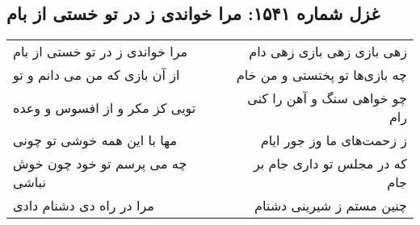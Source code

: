 \begin{center}
\section*{غزل شماره ۱۵۴۱: مرا خواندی ز در تو خستی از بام}
\label{sec:1541}
\begin{longtable}{l p{0.5cm} r}
مرا خواندی ز در تو خستی از بام
&&
زهی بازی زهی بازی زهی دام
\\
از آن بازی که من می دانم و تو
&&
چه بازی‌ها تو پختستی و من خام
\\
تویی کز مکر و از افسوس و وعده
&&
چو خواهی سنگ و آهن را کنی رام
\\
مها با این همه خوشی تو چونی
&&
ز زحمت‌های ما وز جور ایام
\\
چه می پرسم تو خود چون خوش نباشی
&&
که در مجلس تو داری جام بر جام
\\
مرا در راه دی دشنام دادی
&&
چنین مستم ز شیرینی دشنام
\\
\end{longtable}
\end{center}
